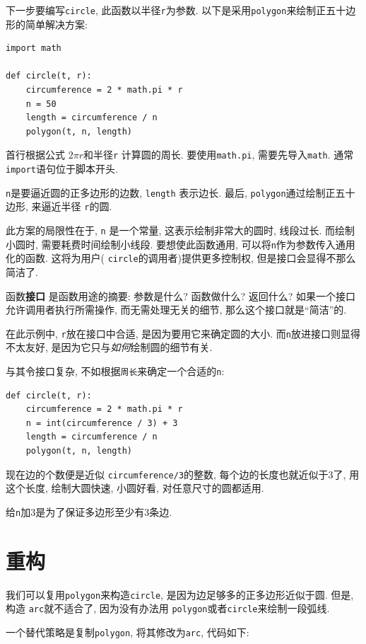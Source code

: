 \documentclass[10pt]{book}
\begin{document}
下一步要编写{\tt circle}, 此函数以半径{\tt r}为参数. 
以下是采用{\tt polygon}来绘制正五十边形的简单解决方案:

\begin{verbatim}
import math

def circle(t, r):
    circumference = 2 * math.pi * r
    n = 50
    length = circumference / n
    polygon(t, n, length)
\end{verbatim}
%
首行根据公式 $2 \pi r$和半径{\tt r} 计算圆的周长. 
要使用{\tt math.pi},  需要先导入{\tt math}. 
通常{\tt import}语句位于脚本开头. 

{\tt n}是要逼近圆的正多边形的边数, {\tt length} 表示边长. 
最后,  {\tt polygon}通过绘制正五十边形, 来逼近半径 {\tt r}的圆. 

此方案的局限性在于, {\tt n} 是一个常量, 这表示绘制非常大的圆时, 线段过长. 
而绘制小圆时, 需要耗费时间绘制小线段. 
要想使此函数通用, 可以将{\tt n}作为参数传入通用化的函数. 
这将为用户( {\tt circle}的调用者)提供更多控制权, 但是接口会显得不那么简洁了. 

函数{\bf 接口} 是函数用途的摘要: 参数是什么? 函数做什么? 返回什么? 
如果一个接口允许调用者执行所需操作, 而无需处理无关的细节, 那么这个接口就是``简洁''的. 

在此示例中, {\tt r}放在接口中合适, 是因为要用它来确定圆的大小. 
而{\tt n}放进接口则显得不太友好, 是因为它只与{\em 如何}绘制圆的细节有关. 

与其令接口复杂, 不如根据{\tt 周长}来确定一个合适的{\tt n}:

\begin{verbatim}
def circle(t, r):
    circumference = 2 * math.pi * r
    n = int(circumference / 3) + 3
    length = circumference / n
    polygon(t, n, length)
\end{verbatim}
%
现在边的个数便是近似 {\tt circumference/3}的整数, 
每个边的长度也就近似于3了, 用这个长度, 绘制大圆快速, 小圆好看, 
对任意尺寸的圆都适用. 

给{\tt n}加3是为了保证多边形至少有3条边. 

\section{重构}
\label{refactoring}

我们可以复用{\tt polygon}来构造{\tt circle}, 是因为边足够多的正多边形近似于圆. 
但是, 构造 {\tt arc}就不适合了, 因为没有办法用 {\tt polygon}或者{\tt circle}来绘制一段弧线. 

一个替代策略是复制{\tt polygon}, 将其修改为{\tt arc}, 代码如下:
\end{document}
